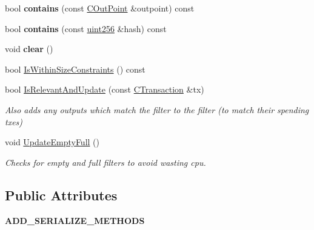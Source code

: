 \begin{DoxyCompactItemize}
bool {\bfseries contains} (const \mbox{\hyperlink{class_c_out_point}{C\+Out\+Point}} \&outpoint) const
\item 
\mbox{\label{class_c_bloom_filter_a4c26810781cdc0fd34443f32612ac83b}} 
bool {\bfseries contains} (const \mbox{\hyperlink{classuint256}{uint256}} \&hash) const
\item 
\mbox{\label{class_c_bloom_filter_abf30228c0b24c57530f6b6734cd40252}} 
void {\bfseries clear} ()
\item 
bool \mbox{\hyperlink{class_c_bloom_filter_a06f2094da8e7d9c6ad4ea426858e32de}{Is\+Within\+Size\+Constraints}} () const
\item 
\mbox{\label{class_c_bloom_filter_aec420a9b66ab133090c2b4b8ed286f79}} 
bool \mbox{\hyperlink{class_c_bloom_filter_aec420a9b66ab133090c2b4b8ed286f79}{Is\+Relevant\+And\+Update}} (const \mbox{\hyperlink{class_c_transaction}{C\+Transaction}} \&tx)
\begin{DoxyCompactList}\small\item\em Also adds any outputs which match the filter to the filter (to match their spending txes) \end{DoxyCompactList}\item 
\mbox{\label{class_c_bloom_filter_af98b43e91c82a1e4afc7454e8c5672c2}} 
void \mbox{\hyperlink{class_c_bloom_filter_af98b43e91c82a1e4afc7454e8c5672c2}{Update\+Empty\+Full}} ()
\begin{DoxyCompactList}\small\item\em Checks for empty and full filters to avoid wasting cpu. \end{DoxyCompactList}\end{DoxyCompactItemize}
\subsection*{Public Attributes}
\begin{DoxyCompactItemize}
\item 
\mbox{\label{class_c_bloom_filter_aac1b6a065059e07177ec836929190ad0}} 
{\bfseries A\+D\+D\+\_\+\+S\+E\+R\+I\+A\+L\+I\+Z\+E\+\_\+\+M\+E\+T\+H\+O\+DS}
\end{DoxyCompactItemize}


